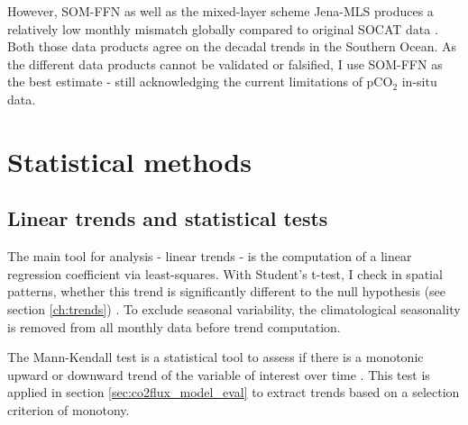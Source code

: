 However, \acs{SOM-FFN} as well as the mixed-layer scheme Jena-MLS \citep{Roedenbeck2013,Roedenbeck2014} produces a relatively low monthly mismatch globally compared to original \acs{SOCAT} data \citep{Roedenbeck2015}. Both those data products agree on the decadal trends in the Southern Ocean. As the different data products cannot be validated or falsified, I use \acs{SOM-FFN} as the best estimate - still acknowledging the current limitations of pCO$_2$ in-situ data.






\section{Statistical methods}

\subsection{Linear trends and statistical tests}
The main tool for analysis - linear trends - is the computation of a linear regression coefficient via least-squares. With Student's t-test, I check in spatial patterns, whether this trend is significantly different to the null hypothesis (see section \ref{ch:trends}) \citep{Mood1974}. To exclude seasonal variability, the climatological seasonality is removed from all monthly data before trend computation. \newline


The Mann-Kendall test is a statistical tool to assess if there is a monotonic upward or downward trend of the variable of interest over time \citep{Mann1945,Kendall1975}. This test is applied in section \ref{sec:co2flux_model_eval} to extract trends based on a selection criterion of monotony.

